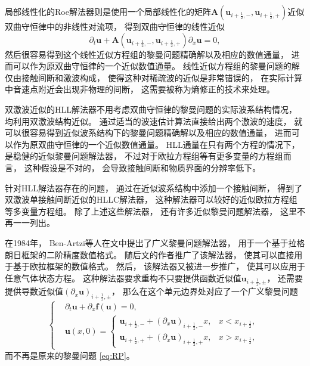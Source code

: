 局部线性化的Roe解法器则是使用一个局部线性化的矩阵${\bm A}({\bm u}_{i+\frac{1}{2},-},{\bm u}_{i+\frac{1}{2},+})$近似双曲守恒律中的非线性对流项，
得到双曲守恒律的线性近似
\begin{equation}
  {\partial_{t}}{\bm{u}} + {\bm A}({\bm u}_{i+\frac{1}{2},-},{\bm u}_{i+\frac{1}{2},+}){\partial_{x}}{\bm{u}} = 0,
\end{equation}
然后很容易得到这个线性近似方程组的黎曼问题精确解以及相应的数值通量，
进而可以作为原双曲守恒律的一个近似数值通量。
线性近似方程组的黎曼问题的解仅由接触间断和激波构成，
使得这种对稀疏波的近似是非常错误的，
在实际计算中音速点附近会出现非物理的间断，
这需要被称为熵修正的技术来处理。

双激波近似的HLL解法器不用考虑双曲守恒律的黎曼问题的实际波系结构情况，
均利用双激波结构近似。
通过适当的波速估计算法直接给出两个激波的速度，
就可以很容易得到近似波系结构下的黎曼问题精确解以及相应的数值通量，
进而可以作为原双曲守恒律的一个近似数值通量。
HLL通量在只有两个方程的情况下，
是稳健的近似黎曼问题解法器，
不过对于欧拉方程组等有更多变量的方程组而言，
这种假设是不对的，
会导致接触间断和物质界面的分辨率低下。

针对HLL解法器存在的问题，
通过在近似波系结构中添加一个接触间断，
得到了双激波单接触间断近似的HLLC解法器，
这种解法器可以较好的近似欧拉方程组等多变量方程组。
除了上述这些解法器，
还有许多近似黎曼问题解法器，
这里不再一一列出。

在1984年，
Ben-Artzi等人在文\cite{GRPgeneral}中提出了广义黎曼问题解法器，
用于一个基于拉格朗日框架的二阶精度数值格式。
随后文\cite{GRPpolytropic}的作者推广了该解法器，
使其可以直接用于基于欧拉框架的数值格式。
然后，
该解法器又被进一步推广，
使其可以应用于任意气体状态方程。
这种解法器要求重构不只要提供函数近似值${\bm u}_{i+\frac{1}{2},\pm}$，
还需要提供导数近似值$\left({\partial_x}{\bm u}\right)_{i+\frac{1}{2},\pm}$，
那么在这个单元边界处对应了一个广义黎曼问题
\begin{equation}
  \label{eq:GRP}
  \left\{
  \begin{aligned}
     & {\partial_{t}}{\bm{u}} + {\partial_{x}}{\bm{f}}({\bm{u}}) = 0, \\
     & {\bm{u}}(x,0) =
    \begin{cases}
      {\bm u}_{i+\frac{1}{2},-} + \left({\partial_x}{\bm u}\right)_{i+\frac{1}{2},-} x, & x<x_{i+\frac{1}{2}},  \\
      {\bm u}_{i+\frac{1}{2},+} + \left({\partial_x}{\bm u}\right)_{i+\frac{1}{2},+} x, & x>x_{i+\frac{1}{2}},
    \end{cases}
  \end{aligned}
  \right.
\end{equation}
而不再是原来的黎曼问题 \cref{eq:RP}。


